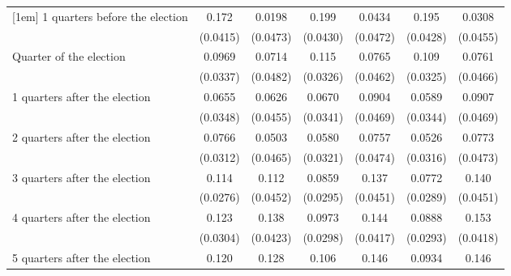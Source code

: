 \begin{table}[htbp]
\begin{tabular}{l*{6}{c}}
[1em]
 1 quarters before the election&       0.172\sym{***}&      0.0198         &       0.199\sym{***}&      0.0434         &       0.195\sym{***}&      0.0308         \\
                    &    (0.0415)         &    (0.0473)         &    (0.0430)         &    (0.0472)         &    (0.0428)         &    (0.0455)         \\
[1em]
Quarter of the election&      0.0969\sym{**} &      0.0714         &       0.115\sym{***}&      0.0765         &       0.109\sym{***}&      0.0761         \\
                    &    (0.0337)         &    (0.0482)         &    (0.0326)         &    (0.0462)         &    (0.0325)         &    (0.0466)         \\
[1em]
 1 quarters after the election&      0.0655         &      0.0626         &      0.0670\sym{*}  &      0.0904         &      0.0589         &      0.0907         \\
                    &    (0.0348)         &    (0.0455)         &    (0.0341)         &    (0.0469)         &    (0.0344)         &    (0.0469)         \\
[1em]
 2 quarters after the election&      0.0766\sym{*}  &      0.0503         &      0.0580         &      0.0757         &      0.0526         &      0.0773         \\
                    &    (0.0312)         &    (0.0465)         &    (0.0321)         &    (0.0474)         &    (0.0316)         &    (0.0473)         \\
[1em]
 3 quarters after the election&       0.114\sym{***}&       0.112\sym{*}  &      0.0859\sym{**} &       0.137\sym{**} &      0.0772\sym{**} &       0.140\sym{**} \\
                    &    (0.0276)         &    (0.0452)         &    (0.0295)         &    (0.0451)         &    (0.0289)         &    (0.0451)         \\
[1em]
 4 quarters after the election&       0.123\sym{***}&       0.138\sym{**} &      0.0973\sym{**} &       0.144\sym{***}&      0.0888\sym{**} &       0.153\sym{***}\\
                    &    (0.0304)         &    (0.0423)         &    (0.0298)         &    (0.0417)         &    (0.0293)         &    (0.0418)         \\
[1em]
 5 quarters after the election&       0.120\sym{**} &       0.128\sym{**} &       0.106\sym{**} &       0.146\sym{***}&      0.0934\sym{**} &       0.146\sym{***}\\

\end{tabular}
\end{table}
